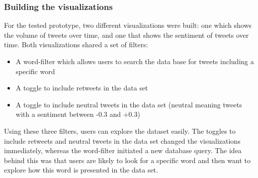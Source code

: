 \subsubsection{Building the visualizations}
For the tested prototype, two different visualizations were built: one which shows the volume of tweets over time, and one that shows the sentiment of tweets over time. Both visualizations shared a set of filters:
\begin{itemize}
    \item A word-filter which allows users to search the data base for tweets including a specific word
    \item A toggle to include retweets in the data set
    \item A toggle to include neutral tweets in the data set (neutral meaning tweets with a sentiment between -0.3 and +0.3)
\end{itemize}
Using these three filters, users can explore the dataset easily. The toggles to include retweets and neutral tweets in the data set changed the visualizations immediately, whereas the word-filter initiated a new database query. The idea behind this was that users are likely to look for a specific word and then want to explore how this word is presented in the data set. 